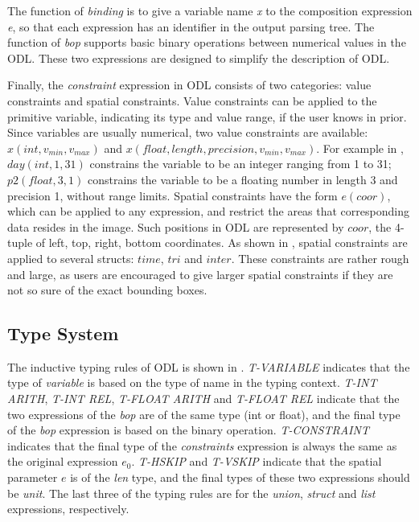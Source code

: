 The function of \textit{binding} is to give a variable name \textit{x} to
the composition expression \textit{e}, so that each expression has an identifier
in the output parsing tree.
The function of \textit{bop} supports basic binary operations between numerical
values in the ODL.
These two expressions are designed to simplify the description of ODL.

Finally, the \textit{constraint} expression in ODL consists of two categories:
value constraints and spatial constraints.
Value constraints can be applied to the primitive variable,
indicating its type and value range, if the user knows in prior.
Since variables are usually numerical, two value constraints are available:
$x(int, v_{min}, v_{max})$ and
$x(float, length, precision, v_{min}, v_{max})$.
For example in ,
$day(int, 1, 31)$ constrains the variable to be an integer ranging from 1 to 31;
$p2(float, 3, 1)$ constrains the variable to be a floating number in length 3
and precision 1, without range limits.
Spatial constraints have the form $e(coor)$,
which can be applied to any expression,
and restrict the areas that corresponding data resides in the image.
Such positions in ODL are represented by $coor$, the 4-tuple of
left, top, right, bottom coordinates.
As shown in , spatial constraints
are applied to several structs: $time$, $tri$ and $inter$.
These constraints are rather rough and large,
as users are encouraged to give larger spatial constraints
if they are not so sure of the exact bounding boxes.


\subsection{Type System}

The inductive typing rules of ODL is shown in .
\textit{T-VARIABLE} indicates that the type of \textit{variable} is
based on the type of name in the typing context.
\textit{T-INT ARITH}, \textit{T-INT REL}, \textit{T-FLOAT ARITH} and
\textit{T-FLOAT REL} indicate that the two expressions of the \textit{bop}
are of the same type (int or float), and the final type of the \textit{bop}
expression is based on the binary operation.
\textit{T-CONSTRAINT} indicates that the final type of the \textit{constraints} expression is always the same as the original expression $e_0$.
\textit{T-HSKIP} and \textit{T-VSKIP} indicate that the spatial parameter $e$
is of the \textit{len} type, and the final types of these two expressions
should be \textit{unit}.
The last three of the typing rules are for
the \textit{union}, \textit{struct} and \textit{list} expressions, respectively.

